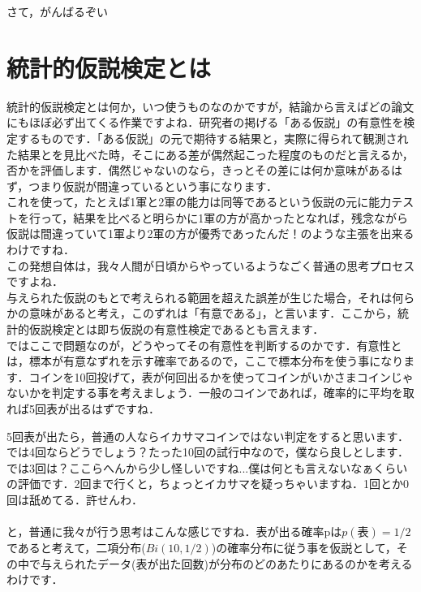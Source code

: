 \documentclass[11pt,a4paper,uplatex]{ujreport} 	%
\begin{document}
さて，がんばるぞい\\

\section{統計的仮説検定とは}
統計的仮説検定とは何か，いつ使うものなのかですが，結論から言えばどの論文にもほぼ必ず出てくる作業ですよね．研究者の掲げる「ある仮説」の有意性を検定するものです．「ある仮説」の元で期待する結果と，実際に得られて観測された結果とを見比べた時，そこにある差が偶然起こった程度のものだと言えるか，否かを評価します．偶然じゃないのなら，きっとその差には何か意味があるはず，つまり仮説が間違っているという事になります．\\

これを使って，たとえば1軍と2軍の能力は同等であるという仮説の元に能力テストを行って，結果を比べると明らかに1軍の方が高かったとなれば，残念ながら仮説は間違っていて1軍より2軍の方が優秀であったんだ！のような主張を出来るわけですね．\\

この発想自体は，我々人間が日頃からやっているようなごく普通の思考プロセスですよね．\\

与えられた仮説のもとで考えられる範囲を超えた誤差が生じた場合，それは何らかの意味があると考え，このずれは「有意である」，と言います．ここから，統計的仮説検定とは即ち仮説の有意性検定であるとも言えます．\\

ではここで問題なのが，どうやってその有意性を判断するのかです．有意性とは，標本が有意なずれを示す確率であるので，ここで標本分布を使う事になります．コインを10回投げて，表が何回出るかを使ってコインがいかさまコインじゃないかを判定する事を考えましょう．一般のコインであれば，確率的に平均を取れば5回表が出るはずですね．

5回表が出たら，普通の人ならイカサマコインではない判定をすると思います．では4回ならどうでしょう？たった10回の試行中なので，僕なら良しとします．では3回は？ここらへんから少し怪しいですね...僕は何とも言えないなぁくらいの評価です．2回まで行くと，ちょっとイカサマを疑っちゃいますね．1回とか0回は舐めてる．許せんわ．\\\\

と，普通に我々が行う思考はこんな感じですね．表が出る確率pは$p(表)=1/2$であると考えて，二項分布($Bi(10,1/2)$)の確率分布に従う事を仮説として，その中で与えられたデータ(表が出た回数)が分布のどのあたりにあるのかを考えるわけです．
\end{document}
